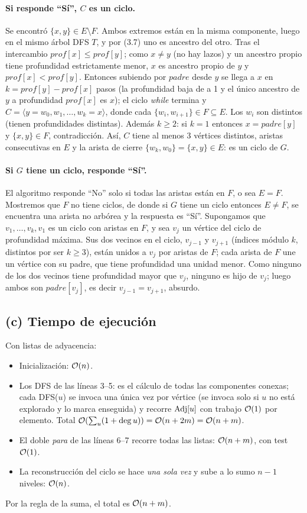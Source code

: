 \paragraph{Si responde ``Sí'', $C$ es un ciclo.} Se encontró $\{x,y\}\in E\setminus F$. Ambos
extremos están en la misma componente, luego en el mismo árbol DFS $T$, y por (3.7) uno es ancestro
del otro. Tras el intercambio $prof[x]\le prof[y]$; como $x\ne y$ (no hay lazos) y un ancestro
propio tiene profundidad estrictamente menor, $x$ es ancestro propio de $y$ y $prof[x]<prof[y]$.
Entonces subiendo por $padre$ desde $y$ se llega a $x$ en $k=prof[y]-prof[x]$ pasos (la profundidad
baja de a 1 y el único ancestro de $y$ a profundidad $prof[x]$ es $x$); el ciclo \emph{while}
termina y $C=\langle y=w_0,w_1,\dots,w_k=x\rangle$, donde cada $\{w_i,w_{i+1}\}\in F\subseteq E$. Los
$w_i$ son distintos (tienen profundidades distintas). Además $k\ge 2$: si $k=1$ entonces $x=padre[y]$
y $\{x,y\}\in F$, contradicción. Así, $C$ tiene al menos 3 vértices distintos, aristas consecutivas
en $E$ y la arista de cierre $\{w_k,w_0\}=\{x,y\}\in E$: es un ciclo de $G$.

\paragraph{Si $G$ tiene un ciclo, responde ``Sí''.} El algoritmo responde ``No'' solo si todas las
aristas están en $F$, o sea $E=F$. Mostremos que $F$ no tiene ciclos, de donde si $G$ tiene un ciclo
entonces $E\neq F$, se encuentra una arista no arbórea y la respuesta es ``Sí''. Supongamos que
$v_1,\dots,v_k,v_1$ es un ciclo con aristas en $F$, y sea $v_j$ un vértice del ciclo de profundidad
máxima. Sus dos vecinos en el ciclo, $v_{j-1}$ y $v_{j+1}$ (índices módulo $k$, distintos por ser
$k\ge3$), están unidos a $v_j$ por aristas de $F$; cada arista de $F$ une un vértice con su padre, que
tiene profundidad una unidad menor. Como ninguno de los dos vecinos tiene profundidad mayor que
$v_j$, ninguno es hijo de $v_j$; luego ambos son $padre[v_j]$, es decir $v_{j-1}=v_{j+1}$, absurdo.

\subsection*{(c) Tiempo de ejecución}
Con listas de adyacencia:
\begin{itemize}[nosep]
  \item Inicialización: $\mathcal{O}(n)$.
  \item Los DFS de las líneas 3--5: es el cálculo de todas las componentes conexas; cada \textsc{DFS}($u$)
  se invoca una única vez por vértice (se invoca solo si $u$ no está explorado y lo marca enseguida) y
  recorre $\mathrm{Adj}[u]$ con trabajo $\mathcal{O}(1)$ por elemento. Total $\mathcal{O}(\sum_u(1+\deg u))=\mathcal{O}(n+2m)=\mathcal{O}(n+m)$.
  \item El doble \emph{para} de las líneas 6--7 recorre todas las listas: $\mathcal{O}(n+m)$, con test $\mathcal{O}(1)$.
  \item La reconstrucción del ciclo se hace \emph{una sola vez} y sube a lo sumo $n-1$ niveles: $\mathcal{O}(n)$.
\end{itemize}
Por la regla de la suma, el total es $\mathcal{O}(n+m)$.

